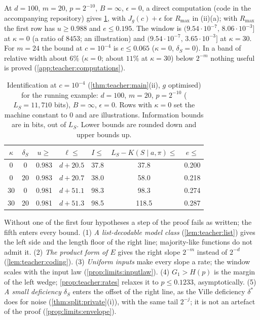 \begin{remark}\label{rem:teacher:numbers}
At $d=100$, $m=20$, $p=2^{-10}$, $B=\infty$, $\epsilon=0$, a direct computation (code in the accompanying repository) gives \cref{tab:teacher:numbers}, with $J_g(c)+\epsilon$ for $R_{\max}$ in (ii)(a); with $R_{\max}$ the first row has $u\ge0.988$ and $e\le0.195$. The window is $(9.54\cdot10^{-7},\,8.06\cdot10^{-3}]$ at $\kappa=0$ (a ratio of $8453$; an illustration) and $(9.54\cdot10^{-7},\,3.65\cdot10^{-3}]$ at $\kappa=30$. For $m=24$ the bound at $c=10^{-4}$ is $e\le0.065$ ($\kappa=0$, $\delta_S=0$). In a band of relative width about $6\%$ ($\kappa=0$; about $11\%$ at $\kappa=30$) below $2^{-m}$ nothing useful is proved (\cref{app:teacher:computations}).
\end{remark}

\begin{table}[t]
\centering\small
\begin{tabular}{@{}cc|ccccc@{}}
\toprule
$\kappa$ & $\delta_S$ & $u\ge$ & $\ell\le$ & $I\le$ & $L_S-K(S\mid a,\pi)\le$ & $e\le$\\
\midrule
0 & 0 & 0.983 & $d+20.5$ & 37.8 & 37.8 & 0.200\\
0 & 20 & 0.983 & $d+20.7$ & 38.0 & 58.0 & 0.218\\
30 & 0 & 0.981 & $d+51.1$ & 98.3 & 98.3 & 0.274\\
30 & 20 & 0.981 & $d+51.3$ & 98.5 & 118.5 & 0.287\\
\bottomrule
\end{tabular}
\caption{Identification at $c=10^{-4}$ (\cref{thm:teacher:main}(ii), $g$ optimised) for the running example: $d=100$, $m=20$, $p=2^{-10}$ ($L_S=11{,}710$ bits), $B=\infty$, $\epsilon=0$. Rows with $\kappa=0$ set the machine constant to $0$ and are illustrations. Information bounds are in bits, out of $L_S$. Lower bounds are rounded down and upper bounds up.}
\label{tab:teacher:numbers}
\end{table}

\begin{remark}\label{rem:teacher:hypotheses}
Without one of the first four hypotheses a step of the proof fails as written; the fifth enters every bound. (1) \emph{A list-decodable model class} (\cref{lem:teacher:list}) gives the left side and the length floor of the right line; majority-like functions do not admit it. (2) \emph{The product form of $E$} gives the right slope $2^{-m}$ instead of $2^{-d}$ (\cref{lem:teacher:coding}). (3) \emph{Uniform inputs} make every slope a rate; the window scales with the input law (\cref{prop:limits:inputlaw}). (4) \emph{$G_1>H(p)$} is the margin of the left wedge; \cref{prop:teacher:rates} relaxes it to $p\le0.1233$, asymptotically. (5) \emph{A small deficiency $\delta_S$} enters the offset of the right line, as the Ville deficiency $\delta^*$ does for noise (\cref{thm:split:private}(i)), with the same tail $2^{-j}$; it is not an artefact of the proof (\cref{prop:limits:envelope}).
\end{remark}

